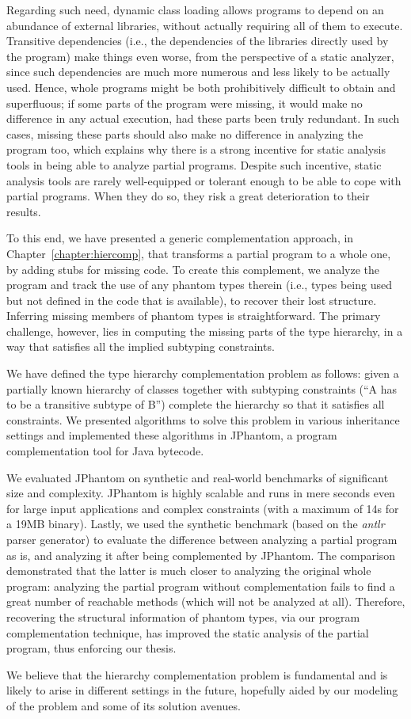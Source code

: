 Regarding such need, dynamic class loading allows programs to depend
on an abundance of external libraries, without actually requiring all
of them to execute. Transitive dependencies (i.e., the dependencies of
the libraries directly used by the program) make things even worse,
from the perspective of a static analyzer, since such dependencies are
much more numerous and less likely to be actually used. Hence, whole
programs might be both prohibitively difficult to obtain and
superfluous; if some parts of the program were missing, it would make
no difference in any actual execution, had these parts been truly
redundant. In such cases, missing these parts should also make no
difference in analyzing the program too, which explains why there is a
strong incentive for static analysis tools in being able to analyze
partial programs. Despite such incentive, static analysis tools are
rarely well-equipped or tolerant enough to be able to cope with
partial programs. When they do so, they risk a great deterioration to
their results.

To this end, we have presented a generic complementation approach, in
Chapter~\ref{chapter:hiercomp}, that transforms a partial program to a
whole one, by adding stubs for missing code. To create this
complement, we analyze the program and track the use of any phantom types
therein (i.e., types being used but not defined in the code that is
available), to recover their lost structure. Inferring missing members
of phantom types is straightforward. The primary challenge, however,
lies in computing the missing parts of the type hierarchy, in a way
that satisfies all the implied subtyping constraints.

We have defined the type hierarchy complementation problem as follows:
given a partially known hierarchy of classes together with subtyping
constraints (``A has to be a transitive subtype of B'') complete the
hierarchy so that it satisfies all constraints. We presented
algorithms to solve this problem in various inheritance settings
and  implemented these algorithms in JPhantom, a program
complementation tool for Java bytecode.

We evaluated JPhantom on synthetic and real-world benchmarks of
significant size and complexity. JPhantom is highly scalable and runs
in mere seconds even for large input applications and complex
constraints (with a maximum of 14s for a 19MB binary).
%
Lastly, we used the synthetic benchmark (based on the \emph{antlr}
parser generator) to evaluate the difference between analyzing a
partial program as is, and analyzing it after being complemented by
JPhantom. The comparison demonstrated that the latter is much closer
to analyzing the original whole program: analyzing the partial program
without complementation fails to find a great number of reachable
methods (which will not be analyzed at all). Therefore, recovering the
structural information of phantom types, via our program
complementation technique, has improved the static analysis of the
partial program, thus enforcing our thesis.

We believe that the hierarchy complementation problem is fundamental
and is likely to arise in different settings in the future, hopefully
aided by our modeling of the problem and some of its solution avenues.

